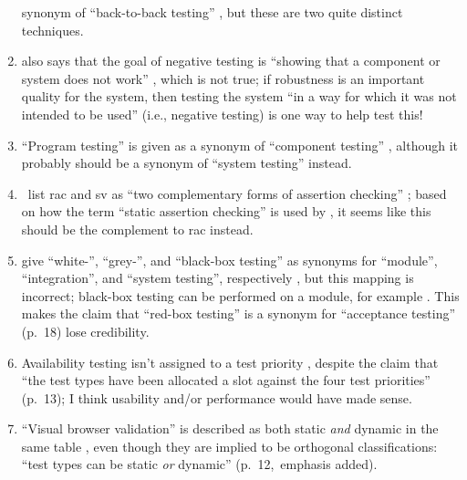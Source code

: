 \begin{enumerate}
            synonym of ``back-to-back testing'' \citeyearpar[p.~46]{Kam2008},
            but these are two quite distinct techniques.
      \item \citeauthor{Kam2008} also says that the goal of negative testing is
            ``showing that a component or system does not work''
            \citeyearpar[p.~46]{Kam2008} , which is not true;
            if robustness is an important quality for the system, then testing
            the system ``in a way for which it was not intended to be used''
            \citepISTQB{} (i.e., negative testing) is one way to help
            test this!
      \item ``Program testing'' is given as a synonym of ``component testing''
            \citep[p.~46]{Kam2008}, although it probably should be a synonym of
            ``system testing'' instead.
      \item \citeauthor{ChalinEtAl2006}~list \acf{rac} and \acf{sv} as ``two
            complementary forms of assertion checking''
            \citeyearpar[p.~343]{ChalinEtAl2006}; based on how the term ``static
            assertion checking'' is used by \citet[p.~345]{LahiriEtAl2013}, it
            seems like this should be the complement to \acs{rac} instead.
      \item \citeauthor{SneedAndGöschl2000} give ``white-'', ``grey-'', and
            ``black-box testing'' as synonyms for ``module'', ``integration'',
            and ``system testing'', respectively
            \citeyearpar[p.~18]{SneedAndGöschl2000} , but
            this mapping is incorrect; black-box testing can be performed on a
            module, for example . This makes the claim that
            ``red-box testing'' is a synonym for ``acceptance testing'' (p.~18)
            lose credibility.
      \item Availability testing isn't assigned to a test priority
            \citep[Tab.~2]{Gerrard2000a}, despite the claim that ``the test
            types have been allocated a slot against
            the four test priorities'' (p.~13); I think usability and/or
            performance would have made sense.
      \item ``Visual browser validation'' is described as both static \emph{and}
            dynamic in the same table \citep[Tab.~2]{Gerrard2000a}, even though
            they are implied to be orthogonal classifications: ``test
            types can be static \emph{or} dynamic'' (p.~12,~emphasis added).

\end{enumerate}
